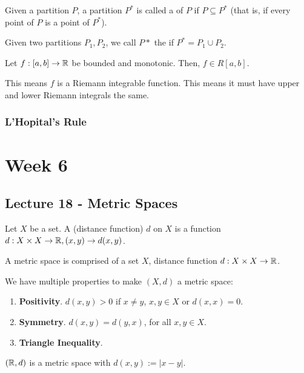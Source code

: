 \documentclass{book}
\begin{document}
\begin{defn}
    Given a partition $P$, a partition $P^*$ is called a  of $P$ if $P \subseteq P^*$ (that is, if every point of $P$ is a point of $P^*$). 
\end{defn}

Given two partitions $P_1, P_2$, we call $P*$ the  if $P^* = P_1 \cup P_2$.

\begin{thm}
    Let $f: [a, b] \to \mathbb{R}$ be bounded and monotonic. Then, $f \in R[a, b]$.

    This means $f$ is a Riemann integrable function. This means it must have upper and lower Riemann integrals the same.
\end{thm}

\subsection{L'Hopital's Rule}
\chapter{Week 6}
\section{Lecture 18 - Metric Spaces}
\begin{defn} Let $X$ be a set. A  (distance function) $d$ on $X$ is a function $d : X \times X \to \mathbb{R}, (x, y) \to d(x, y)$.
\end{defn}

\begin{defn}
    A metric space is comprised of a set $X$, distance function $d : X \times X \to \mathbb{R}$.

    We have multiple properties to make $(X, d)$ a metric space:
    \begin{enumerate}
        \item \textbf{Positivity}. $d(x, y) > 0$ if $x \neq y$, $x, y \in X$ or $d(x, x) = 0$.
        \item \textbf{Symmetry}. $d(x, y) = d(y, x)$, for all $x, y \in X$.
        \item \textbf{Triangle Inequality}.
    \end{enumerate}
\end{defn}

\begin{ex}
    $(\mathbb{R}, d)$ is a metric space with $d(x, y) := |x - y|$. 
\end{ex}
\end{document}
